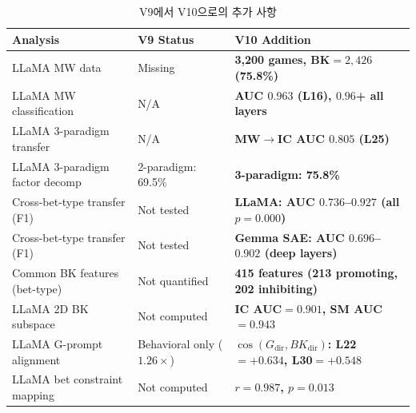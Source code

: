 \documentclass[11pt,a4paper]{article}
\begin{document}
\begin{table}[H]
\centering
\caption{V9에서 V10으로의 추가 사항}\label{tab:a1}
\footnotesize
\begin{tabular}{lp{4cm}p{6cm}}
\toprule
Analysis & V9 Status & V10 Addition \\
\midrule
LLaMA MW data & Missing & \textbf{3,200 games, BK$=2{,}426$ (75.8\%)} \\
LLaMA MW classification & N/A & \textbf{AUC $0.963$ (L16), $0.96$+ all layers} \\
LLaMA 3-paradigm transfer & N/A & \textbf{MW$\rightarrow$IC AUC $0.805$ (L25)} \\
LLaMA 3-paradigm factor decomp & 2-paradigm: 69.5\% & \textbf{3-paradigm: 75.8\%} \\
Cross-bet-type transfer (F1) & Not tested & \textbf{LLaMA: AUC $0.736$--$0.927$ (all $p=0.000$)} \\
Cross-bet-type transfer (F1) & Not tested & \textbf{Gemma SAE: AUC $0.696$--$0.902$ (deep layers)} \\
Common BK features (bet-type) & Not quantified & \textbf{415 features (213 promoting, 202 inhibiting)} \\
LLaMA 2D BK subspace & Not computed & \textbf{IC AUC$=0.901$, SM AUC$=0.943$} \\
LLaMA G-prompt alignment & Behavioral only ($1.26\times$) & \textbf{$\cos(G_\mathrm{dir}, BK_\mathrm{dir})$: L22$=+0.634$, L30$=+0.548$} \\
LLaMA bet constraint mapping & Not computed & \textbf{$r=0.987$, $p=0.013$} \\
\bottomrule
\end{tabular}
\end{table}
\end{document}
